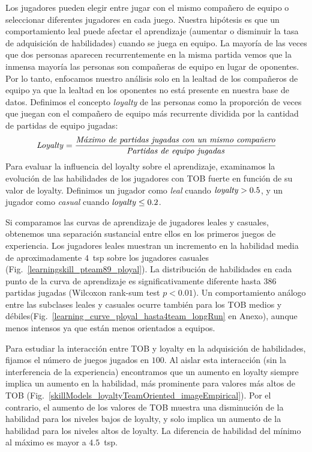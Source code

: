 \documentclass[a4paper,11pt]{book}
\theoremstyle{definition}
\begin{document}
Los jugadores pueden elegir entre jugar con el mismo compañero de equipo o seleccionar diferentes jugadores en cada juego.
%
Nuestra hipótesis es que un comportamiento leal puede afectar el aprendizaje (aumentar o disminuir la tasa de adquisición de habilidades) cuando se juega en equipo.
%
La mayoría de las veces que dos personas aparecen recurrentemente en la misma partida vemos que la inmensa mayoría las personas son compañeras de equipo en lugar de oponentes.
%
Por lo tanto, enfocamos nuestro análisis solo en la lealtad de los compañeros de equipo ya que la lealtad en los oponentes no está presente en nuestra base de datos.
%
Definimos el concepto \emph{loyalty} de las personas como la proporción de veces que juegan con el compañero de equipo más recurrente dividida por la cantidad de partidas de equipo jugadas:
%
\begin{equation}
\text{\emph{Loyalty}} = \frac{\text{\emph{Máximo de partidas jugadas con un mismo compañero}}}{\text{\emph{Partidas de equipo jugadas}}}
\end{equation}
%
Para evaluar la influencia del loyalty sobre el aprendizaje, examinamos la evolución de las habilidades de los jugadores con TOB fuerte en función de su valor de loyalty.
%
Definimos un jugador como \emph{leal} cuando $\text{\emph{loyalty}}>0.5$, y un jugador como \emph{casual} cuando $\text{\emph{loyalty}}\leq 0.2$.


Si comparamos las curvas de aprendizaje de jugadores leales y casuales, obtenemos una separación sustancial entre ellos en los primeros juegos de experiencia.
%
Los jugadores leales muestran un incremento en la habilidad media de aproximadamente $4$~tsp sobre los jugadores casuales (Fig.~\ref{learningskill_pteam89_ployal}).
%
La distribución de habilidades en cada punto de la curva de aprendizaje es significativamente diferente hasta $386$ partidas jugadas (Wilcoxon rank-sum test $p<0.01$).
%
Un comportamiento análogo entre las subclases leales y casuales ocurre también para los TOB medios y débiles(Fig.~\ref{learning_curve_ployal_hasta4team_longRun} en Anexo), aunque menos intensos ya que están menos orientados a equipos.


Para estudiar la interacción entre TOB y loyalty en la adquisición de habilidades, fijamos el número de juegos jugados en $100$.
%
Al aislar esta interacción (sin la interferencia de la experiencia) encontramos que un aumento en loyalty siempre implica un aumento en la habilidad, más prominente para valores más altos de TOB (Fig.~\ref{skillModels_loyaltyTeamOriented_imageEmpirical}).
%
Por el contrario, el aumento de los valores de TOB muestra una disminución de la habilidad para los niveles bajos de loyalty, y solo implica un aumento de la habilidad para los niveles altos de loyalty.
%
La diferencia de habilidad del mínimo al máximo es mayor a $4.5$~tsp.
\end{document}
